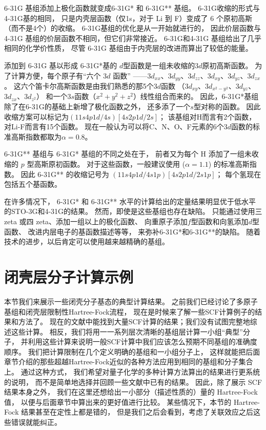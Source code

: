 6-31G 基组添加上极化函数就变成6-31G* 和 6-31G** 基组。 
6-31G收缩的形式与4-31G基的相同，
只是内壳层函数（仅1s，对于 Li 到 F）变成了 6 个原初高斯（而不是4个）的收缩。 
6-31G基组的优化是从一开始就进行的，
因此价层函数与 4-31G 基组的价层函数不相同，但它们非常接近。 
6-31G和4-31G 基组给出了几乎相同的化学价性质，
尽管 6-31G 基组由于内壳层的改进而算出了较低的能量。

添加到 6-31G 基以形成 6-31G*基的 $d$型函数是一组未收缩的$3d$原初高斯函数。 
为了计算方便，每个原子有“六个 $3d$ 函数”
——$3d_{xx}$、$3d_{yy}$、$3d_{zz}$、$3d_{xy}$、$3d_{yz}$、$3d_{zx}$。
这六个笛卡尔高斯函数是由我们熟悉的那5个$3d$函数
（$3d_{xy}$、$3d_{x^2-y^2}$、$3d_{yz}$、$3d_{zx}$、$3d_{z^2}$）
和一个$3s$函数（$x^2+y^2+z^2$）线性组合而来的。
因此，6-31G*基组除了在6-31G的基础上新增了极化函数之外，
还多添了一个$s$型对称的函数。
因此收缩方案可以标记为$(11s4p1d/4s)[4s2p1d/2s]$；
该基组对H而言有2个函数，对Li-F而言有15个函数。
现在一般认为可以将C、N、O、F元素的6个$3d$函数的标准高斯指数都取为$\alpha=0.8$。

6-31G** 基组与 6-31G* 基组的不同之处在于，
前者又为每个 H 添加了一组未收缩的 $p$ 型高斯原初函数。
对于这些函数，一般建议使用 ($\alpha = 1.1$) 的标准高斯指数。
因此 6-31G** 的收缩记号为 $(11s4p1d/4s1p)[4s2p1d/2s1p]$；
每个氢现在包括五个基函数。


在许多情况下，
6-31G* 和 6-31G** 水平的计算给出的定量结果明显优于低水平的STO-3G和4-31G的结果。 
然而，即使是这些基组也存在缺陷。
只能通过使用三 zeta 或四 zeta、添加一组以上的极化函数、
向重原子添加$f$型函数和向氢添加$d$型函数、
改进内层电子的基函数描述等等，
来弥补6-31G*和6-31G**的缺陷。
随着技术的进步，以后肯定可以使用越来越精确的基组。


\section{闭壳层分子计算示例}
本节我们来展示一些闭壳分子基态的典型\hft 计算结果。
之前我们已经讨论了多原子基组和闭壳层限制性Hartree-Fock流程，
现在是时候来了解一些SCF计算例子的结果和方法了。
现在的文献中能找到大量SCF计算的结果；我们没有试图完整地综述这些计算。
相反，我们将用一一系列层次清晰的基组层计算一小组“典型”分子，
并利用这些计算来说明一般SCF计算中我们应该怎么预期不同基组的准确度顺序。
我们把计算限制在几个定义明确的基组和一小组分子上，
这样就能把后面章节介绍的那些超越Hartree-Fock近似的各种方法应用到相同的基组和分子集合上。
通过这种方式，
我们希望对量子化学的多种计算方法算出的结果进行更系统的说明，
而不是简单地选择并回顾一些文献中已有的结果。
因此，除了展示 SCF 结果本身之外，
我们在这里还想给出一小部分（描述性质的）量的 Hartree-Fock 值，
以便与后面章节中算出来的更好值进行比较。
某些情况下，本节的 Hartree-Fock 结果甚至在定性上都是错的，
但是我们之后会看到，考虑了关联效应之后这些错误就能纠正。

